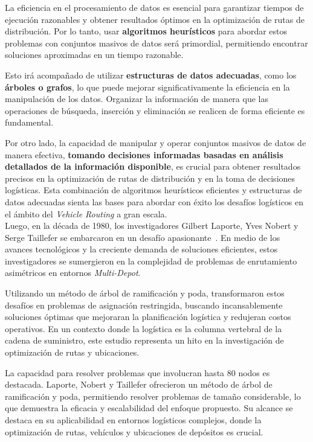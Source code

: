 \documentclass[letter, 10pt]{article}
\begin{document}
La eficiencia en el procesamiento de datos es esencial para garantizar tiempos de ejecución razonables y obtener resultados óptimos en la optimización de rutas de distribución. Por lo tanto, usar \textbf{algoritmos heurísticos} para abordar estos problemas con conjuntos masivos de datos será primordial, permitiendo encontrar soluciones aproximadas en un tiempo razonable.

Esto irá acompañado de utilizar \textbf{estructuras de datos adecuadas}, como los \textbf{árboles o grafos}, lo que puede mejorar significativamente la eficiencia en la manipulación de los datos. Organizar la información de manera que las operaciones de búsqueda, inserción y eliminación se realicen de forma eficiente es fundamental.

Por otro lado, la capacidad de manipular y operar conjuntos masivos de datos de manera efectiva, \textbf{tomando decisiones informadas basadas en análisis detallados de la información disponible}, es crucial para obtener resultados precisos en la optimización de rutas de distribución y en la toma de decisiones logísticas. Esta combinación de algoritmos heurísticos eficientes y estructuras de datos adecuadas sienta las bases para abordar con éxito los desafíos logísticos en el ámbito del \textit{Vehicle Routing} a gran escala.
\\

Luego, en la década de 1980, los investigadores Gilbert Laporte, Yves Nobert y Serge Taillefer se embarcaron en un desafío apasionante~\cite{SolvingAFamilyOfMultiDepot}. En medio de los avances tecnológicos y la creciente demanda de soluciones eficientes, estos investigadores se sumergieron en la complejidad de problemas de enrutamiento asimétricos en entornos \textit{Multi-Depot}.

Utilizando un método de árbol de ramificación y poda, transformaron estos desafíos en problemas de asignación restringida, buscando incansablemente soluciones óptimas que mejoraran la planificación logística y redujeran costos operativos. En un contexto donde la logística es la columna vertebral de la cadena de suministro, este estudio representa un hito en la investigación de optimización de rutas y ubicaciones.

La capacidad para resolver problemas que involucran hasta 80 nodos es destacada. Laporte, Nobert y Taillefer ofrecieron un método de árbol de ramificación y poda, permitiendo resolver problemas de tamaño considerable, lo que demuestra la eficacia y escalabilidad del enfoque propuesto. Su alcance se destaca en su aplicabilidad en entornos logísticos complejos, donde la optimización de rutas, vehículos y ubicaciones de depósitos es crucial.
\end{document}
